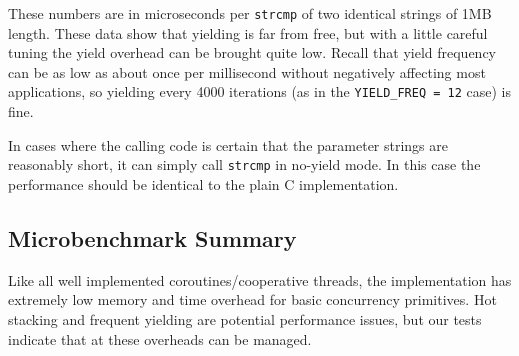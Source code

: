 \documentclass[pldi,10pt,preprint]{sigplanconf-pldi16}
\begin{document}
These numbers are in microseconds per \texttt{strcmp} of two identical strings of 1MB length.
These data show that yielding is far from free, but with a little careful tuning the yield overhead can be brought quite low.
Recall that yield frequency can be as low as about once per millisecond without negatively affecting most applications, so yielding every 4000 iterations (as in the \texttt{YIELD\_FREQ = 12} case) is fine.

In cases where the calling code is certain that the parameter strings are reasonably short, it can simply call \texttt{strcmp} in no-yield mode.
In this case the performance should be identical to the plain C implementation.


\subsection{Microbenchmark Summary}

Like all well implemented coroutines/cooperative threads, the \charcoal{} implementation has extremely low memory and time overhead for basic concurrency primitives.
Hot stacking and frequent yielding are potential performance issues, but our tests indicate that at these overheads can be managed.



\end{document}
